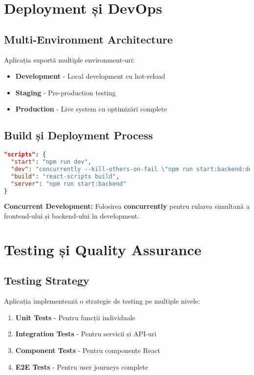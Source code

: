 \documentclass[11pt,a4paper]{article}
\begin{document}
\section{Deployment și DevOps}

\subsection{Multi-Environment Architecture}

Aplicația suportă multiple environment-uri:
\begin{itemize}
    \item \textbf{Development} - Local development cu hot-reload
    \item \textbf{Staging} - Pre-production testing
    \item \textbf{Production} - Live system cu optimizări complete
\end{itemize}

\subsection{Build și Deployment Process}

\begin{lstlisting}[language=JSON, caption=Package.json Scripts Configuration]
"scripts": {
  "start": "npm run dev",
  "dev": "concurrently --kill-others-on-fail \"npm run start:backend:dev\" \"npm run start:frontend\"",
  "build": "react-scripts build",
  "server": "npm run start:backend"
}
\end{lstlisting}

\textbf{Concurrent Development:} Folosirea \textbf{concurrently} pentru rularea simultană a frontend-ului și backend-ului în development.

\section{Testing și Quality Assurance}

\subsection{Testing Strategy}

Aplicația implementează o strategie de testing pe multiple nivele:
\begin{enumerate}
    \item \textbf{Unit Tests} - Pentru funcții individuale
    \item \textbf{Integration Tests} - Pentru servicii și API-uri
    \item \textbf{Component Tests} - Pentru componente React
    \item \textbf{E2E Tests} - Pentru user journeys complete
\end{enumerate}
\end{document}
